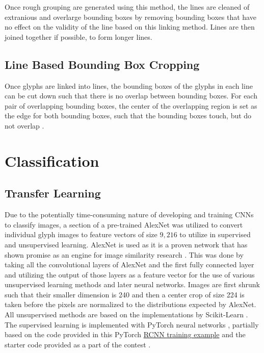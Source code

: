 Once rough grouping are generated using this method, the lines are cleaned of extranious and overlarge bounding boxes by removing bounding boxes that have no effect on the validity of the line based on this linking method. Lines are then joined together if possible, to form longer lines.

\subsection{Line Based Bounding Box Cropping}

Once glyphs are linked into lines, the bounding boxes of the glyphs in each line can be cut down such that there is no overlap between bounding boxes. For each pair of overlapping bounding boxes, the center of the overlapping region is set as the edge for both bounding boxes, such that the bounding boxes touch, but do not overlap .

\section{Classification}

\subsection{Transfer Learning}

Due to the potentially time-consuming nature of developing and training CNNs to classify images, a section of a pre-trained AlexNet \cite{Krizhevsky} was utilized to convert individual glyph images to feature vectors of size $9,216$ to utilize in supervised and unsupervised learning. AlexNet is used as it is a proven network that has shown promise as an engine for image similarity research \cite{Vadicamo, Yuan}. This was done by taking all the convolutional layers of AlexNet and the first fully connected layer and utilizing the output of those layers as a feature vector for the use of various unsupervised learning methods and later neural networks. Images are first shrunk such that their smaller dimension is 240 and then a center crop of size 224 is taken before the pixels are normalized to the distributions expected by AlexNet. All unsupervised methods are based on the implementations by Scikit-Learn \cite{Scikit}. The supervised learning is implemented with PyTorch neural networks \cite{PyTorch}, partially based on the code provided in this PyTorch \href{https://pytorch.org/tutorials/intermediate/torchvision\_tutorial.html}{RCNN training example} and the starter code provided as a part of the contest \cite{Contest}.

